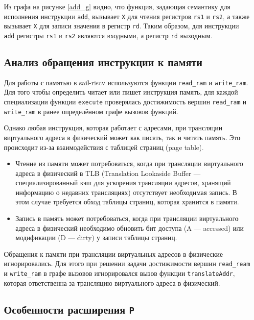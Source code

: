 Из графа на рисунке \ref{add_g} видно, что функция, задающая семантику для исполнения инструкции \texttt{add}, вызывает \texttt{X} для чтения регистров \texttt{rs1} и \texttt{rs2}, а также вызывает \texttt{X} для записи значения в регистр \texttt{rd}.
Таким образом, для инструкции \texttt{add} регистры \texttt{rs1} и \texttt{rs2} являются входными, а регистр \texttt{rd} выходным.

\subsection{Анализ обращения инструкции к памяти}

Для работы с памятью в sail-riscv используются функции \texttt{read\_ram} и \texttt{write\_ram}.
Для того чтобы определить читает или пишет инструкция память, для каждой специализации функции \texttt{execute} проверялась достижимость вершин \texttt{read\_ram} и \texttt{write\_ram} в ранее определённом графе вызовов функций.

Однако любая инструкция, которая работает с адресами, при трансляции виртуального адреса в физический может как писать, так и читать память.
Это происходит из-за взаимодействия с таблицей страниц (page table).
\begin{itemize}
  \item Чтение из памяти может потребоваться, когда при трансляции виртуального адреса в физический в TLB (Translation Lookaside Buffer — специализированный кэш для ускорения трансляции адресов, хранящий информацию о недавних трансляциях) отсутствует необходимая запись. В этом случае требуется обход таблицы страниц, которая хранится в памяти.
  \item Запись в память может потребоваться, когда при трансляции виртуального адреса в физический необходимо обновить бит доступа (A --- accessed) или модификации (D --- dirty) у записи таблицы страниц.
\end{itemize}

Обращения к памяти при трансляции виртуальных адресов в физические игнорировались.
Для этого при решении задачи достижимости вершин \texttt{read\_ream} и \texttt{write\_ram} в графе вызовов игнорировался вызов функции \texttt{translateAddr}, которая ответственна за трансляцию виртуального адреса в физический.

\subsection{Особенности расширения \texttt{P}}

